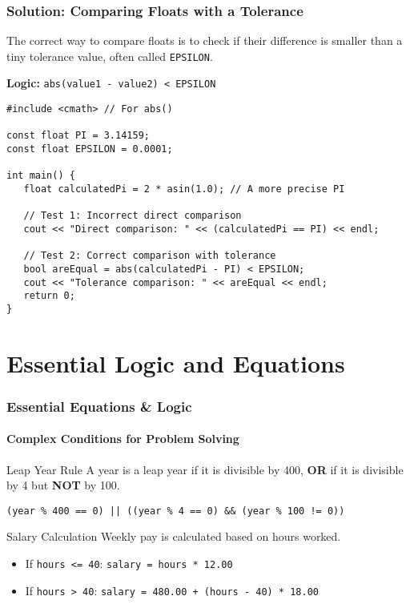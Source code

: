 \documentclass{beamer}
\begin{document}
\begin{frame}[fragile]
\frametitle{Solution: Comparing Floats with a Tolerance}
The correct way to compare floats is to check if their difference is smaller than a tiny tolerance value, often called \texttt{EPSILON}.

\textbf{Logic:} \texttt{abs(value1 - value2) < EPSILON}
\vfill

\begin{verbatim}
#include <cmath> // For abs()

const float PI = 3.14159;
const float EPSILON = 0.0001;

int main() {
   float calculatedPi = 2 * asin(1.0); // A more precise PI

   // Test 1: Incorrect direct comparison
   cout << "Direct comparison: " << (calculatedPi == PI) << endl;

   // Test 2: Correct comparison with tolerance
   bool areEqual = abs(calculatedPi - PI) < EPSILON;
   cout << "Tolerance comparison: " << areEqual << endl;
   return 0;
}
\end{verbatim}
\end{frame}

\section{Essential Logic and Equations}

\begin{frame}
\frametitle{Essential Equations \& Logic}
\framesubtitle{Complex Conditions for Problem Solving}
\begin{block}{Leap Year Rule}
A year is a leap year if it is divisible by 400, \textbf{OR} if it is divisible by 4 but \textbf{NOT} by 100.
\begin{center}
\texttt{(year \% 400 == 0) || ((year \% 4 == 0) \&\& (year \% 100 != 0))}
\end{center}
\end{block}
\pause
\begin{block}{Salary Calculation}
Weekly pay is calculated based on hours worked.
\begin{itemize}
    \item If \texttt{hours <= 40}: \quad \texttt{salary = hours * 12.00}
    \item If \texttt{hours > 40}: \quad \texttt{salary = 480.00 + (hours - 40) * 18.00}
\end{itemize}
\end{block}
\end{frame}
\end{document}
